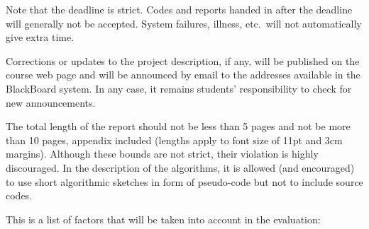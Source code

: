 \begin{remarks}
    Note that the deadline is strict. Codes and reports handed in after
    the deadline will generally not be accepted. System failures,
    illness, etc.\ will not automatically give extra time.
 
 
\item Corrections or updates to the project description, if any, will be
  published on the course web page and will be announced by email to the
  addresses available in the BlackBoard system. In any case, it remains
  students' responsibility to check for new announcements.


%
%
%

%
%

%

\item The total length of the report should not be less than 5 pages and not
be more than 10 pages, appendix included (lengths apply to font size of
11pt and 3cm margins). Although these bounds are not strict, their
violation is highly discouraged.  In the description of the algorithms,
it is allowed (and encouraged) to use short algorithmic sketches in form
of pseudo-code but not to include source codes.


\item This is a list of factors that will be taken into account in the
evaluation:



\end{remarks}

